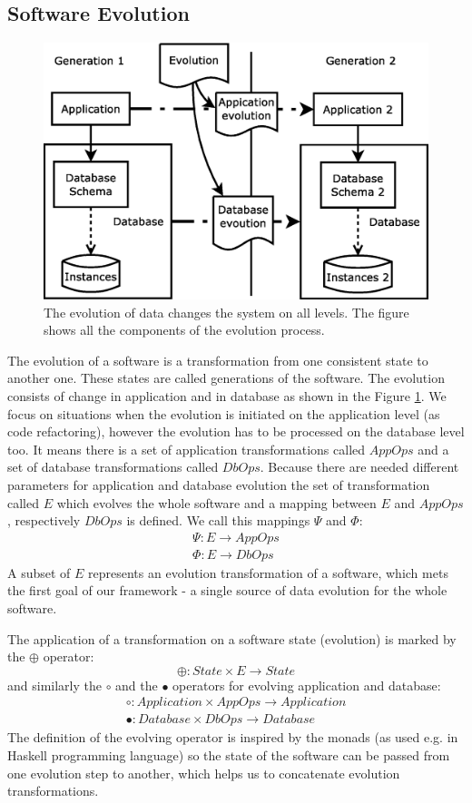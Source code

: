\documentclass[11pt]{article}
\begin{document}
\subsection{Software Evolution}
\begin{figure}
\centering
	\includegraphics[scale=0.4]{./images/evolution_simple}
	\caption{The evolution of data changes the system on all levels. The figure shows all the components of the evolution process.}
	\label{fig:evolution}
\end{figure}
The evolution of a software is a transformation from one consistent state to another one. These states are called generations of the software. The evolution consists of change in application and in database as shown in the Figure \ref{fig:evolution}. We focus on situations when the evolution is initiated on the application level (as code refactoring), however the evolution has to be processed on the database level too. It means there is a set of application transformations called $AppOps$ and a set of database transformations called $DbOps$. Because there are needed different parameters for application and database evolution the set of transformation called $E$ which evolves the whole software and a mapping between $E$ and $AppOps$, respectively $DbOps$ is defined. We call this mappings $\Psi$ and $\Phi$:
\begin{align*}
\Psi : E \rightarrow AppOps \\
\Phi : E \rightarrow DbOps
\end{align*}
A subset of $E$ represents an evolution transformation of a software, which mets the first goal of our framework - a single source of data evolution for the whole software.

The application of a transformation on a software state (evolution) is marked by the $\oplus$ operator:
$$\oplus : State \times E \rightarrow State $$
and similarly the $\circ$ and the $\bullet$ operators for evolving application and database:
\begin{align*}
\circ : Application \times AppOps \rightarrow Application \\
 \bullet : Database \times DbOps \rightarrow Database
\end{align*}
The definition of the evolving operator is inspired by the monads (as used e.g. in Haskell programming language) so the state of the software can be passed from one evolution step to another, which helps us to concatenate evolution transformations.
\end{document}
